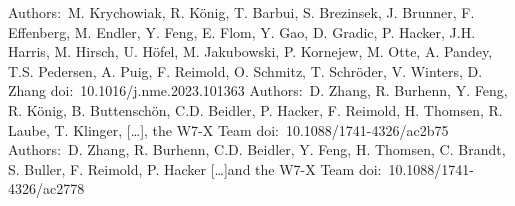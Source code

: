 \documentclass[11pt,a4paper]{moderncv}
\begin{document}
{Authors:~M. Krychowiak, R. König, T. Barbui, S. Brezinsek, J. Brunner, F. Effenberg, M. Endler, Y. Feng, E. Flom, Y. Gao, D. Gradic, P. Hacker, J.H. Harris, M. Hirsch, U. Höfel, M. Jakubowski, P. Kornejew, M. Otte, A. Pandey, T.S. Pedersen, A. Puig, F. Reimold, O. Schmitz, T. Schröder, V. Winters, D. Zhang}{%
    doi:~10.1016/j.nme.2023.101363}{}{}%
{Authors:~D. Zhang, R. Burhenn, Y. Feng, R. König, B. Buttenschön, C.D. Beidler, P. Hacker, F. Reimold, H. Thomsen, R. Laube, T. Klinger, [\dots],  the W7-X Team}{%
    doi:~10.1088/1741-4326/ac2b75}{}{}%
{Authors:~D. Zhang, R. Burhenn, C.D. Beidler, Y. Feng, H. Thomsen, C. Brandt, S. Buller, F. Reimold, P. Hacker [\dots]and the W7-X Team}{%
    doi:~10.1088/1741-4326/ac2778}{}{}%


\end{document}
